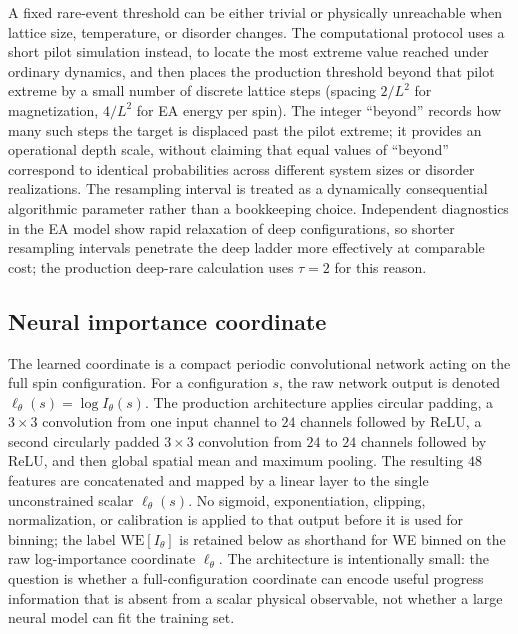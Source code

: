 \documentclass[a4paper,fleqn]{cas-sc}
\newcommand{\WE}{\mathrm{WE}}
\begin{document}
A fixed rare-event threshold can be either trivial or physically unreachable when lattice
size, temperature, or disorder changes. The computational protocol uses a short pilot
simulation instead, to locate the most extreme value reached under ordinary dynamics, and then
places the production threshold beyond that pilot extreme by a small number of discrete
lattice steps (spacing $2/L^2$ for magnetization, $4/L^2$ for EA energy per spin). The integer
``beyond'' records how many such steps the target is displaced past the pilot extreme; it
provides an operational depth scale, without claiming that equal values of ``beyond''
correspond to identical probabilities across different system sizes or disorder realizations.
The resampling interval is treated as a dynamically consequential algorithmic parameter rather than a bookkeeping choice.
Independent diagnostics in the EA model show rapid relaxation of deep configurations, so
shorter resampling intervals penetrate the deep ladder more effectively at comparable cost;
the production deep-rare calculation uses $\tau=2$ for this reason.

\subsection{Neural importance coordinate}\label{sec:neural}
The learned coordinate is a compact periodic convolutional network acting on the full spin
configuration.  For a configuration $s$, the raw network output is denoted
$\ell_\theta(s)=\log I_\theta(s)$.  The production architecture applies circular padding,
a $3\times3$ convolution from one input channel to $24$ channels followed by ReLU, a second
circularly padded $3\times3$ convolution from $24$ to $24$ channels followed by ReLU, and then
global spatial mean and maximum pooling.  The resulting $48$ features are concatenated and
mapped by a linear layer to the single unconstrained scalar $\ell_\theta(s)$.  No sigmoid,
exponentiation, clipping, normalization, or calibration is applied to that output before it is
used for binning; the label $\WE[I_\theta]$ is retained below as shorthand for WE binned on the
raw log-importance coordinate $\ell_\theta$.  The architecture is intentionally small: the
question is whether a full-configuration coordinate can encode useful progress information
that is absent from a scalar physical observable, not whether a large neural model can fit the
training set.
\end{document}
